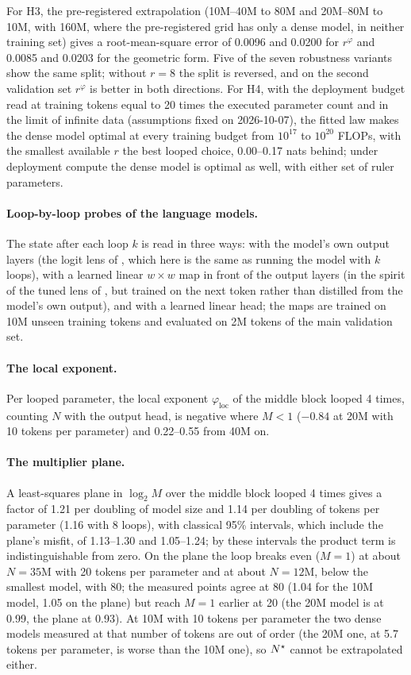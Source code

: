 For H3, the pre-registered extrapolation (10M--40M to 80M and 20M--80M to 10M, with 160M, where the pre-registered grid has only a dense model, in neither training set) gives a root-mean-square error of 0.0096 and 0.0200 for $r^{\varphi}$ and 0.0085 and 0.0203 for the
geometric form. Five of the seven robustness variants show the same split; without $r = 8$ the split is reversed, and
on the second validation set $r^{\varphi}$ is better in both directions. For H4, with the deployment budget read at training tokens equal to 20 times the
executed parameter count and in the limit of infinite data (assumptions fixed on 2026-10-07), the fitted law makes the
dense model optimal at every training budget from $10^{17}$ to $10^{20}$ FLOPs, with the smallest available $r$ the best looped
choice, 0.00--0.17 nats behind; under deployment compute the dense model is optimal as well, with either set of ruler
parameters.

\paragraph{Loop-by-loop probes of the language models.} The state after each loop $k$ is read in three ways: with the
model's own output layers (the logit lens of \citealp{nostalgebraist2020logit}, which here is the same as running the
model with $k$ loops), with a learned linear $w\times w$ map in front of the output layers (in the spirit of the tuned
lens of \citealp{belrose2023tuned}, but trained on the next token rather than distilled from the model's own output),
and with a learned linear head; the maps are trained on 10M unseen training tokens and evaluated on 2M tokens of the
main validation set.

\paragraph{The local exponent.} Per looped parameter, the local exponent $\varphi_{\mathrm{loc}}$ of the middle block
looped 4 times, counting $N$ with the output head, is negative where $M < 1$ ($-0.84$ at 20M with 10 tokens per
parameter) and 0.22--0.55 from 40M on.

\paragraph{The multiplier plane.} A least-squares plane in $\log_2 M$ over the middle block looped 4 times gives a
factor of 1.21 per doubling of model size and 1.14 per doubling of tokens per parameter (1.16 with 8 loops), with
classical 95\% intervals, which include the plane's misfit, of 1.13--1.30 and 1.05--1.24; by these intervals the product
term is indistinguishable from zero. On the plane the loop breaks even ($M = 1$) at about $N = 35$M with 20 tokens per
parameter and at about $N = 12$M, below the smallest model, with 80; the measured points agree at 80 (1.04 for the 10M
model, 1.05 on the plane) but reach $M = 1$ earlier at 20 (the 20M model is at 0.99, the plane at 0.93). At 10M with 10
tokens per parameter the two dense models measured at that number of tokens are out of order (the 20M one, at 5.7
tokens per parameter, is worse than the 10M one), so $N^{\star}$ cannot be extrapolated either.

